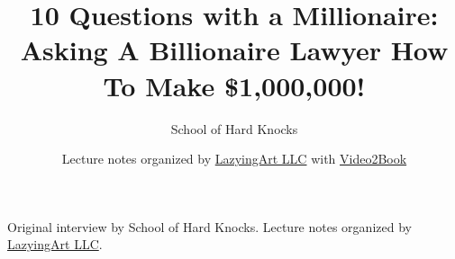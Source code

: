 \documentclass[11pt,oneside]{book}
\begin{document}
\frontmatter
\title{10 Questions with a Millionaire: Asking A Billionaire Lawyer How To Make \$1,000,000!}
\author{School of Hard Knocks}
\date{Lecture notes organized by \href{https://lazying.art}{LazyingArt LLC} with \href{https://github.com/lachlanchen/Video2Book}{Video2Book}}
\maketitle
\begin{center}
\small Original interview by School of Hard Knocks. Lecture notes organized by \href{https://lazying.art}{LazyingArt LLC}.
\end{center}
\clearpage
\mainmatter

\end{document}
